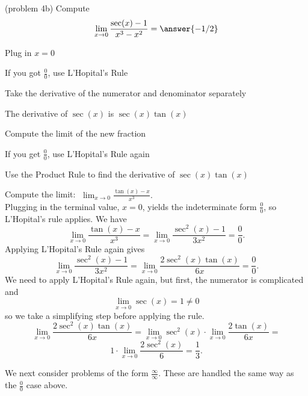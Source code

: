 \documentclass{ximera}
\begin{document}
\begin{problem}(problem 4b)
  Compute
  \[
  \lim_{x \to 0} \frac{\sec(x) - 1}{x^3 - x^2} = \answer{-1/2}
  \]
  
    \begin{hint}
      Plug in $x=0$
    \end{hint}
    \begin{hint}
      If you got $\frac00$, use L'Hopital's Rule
    \end{hint}
    \begin{hint}
      Take the derivative of the numerator and denominator separately
    \end{hint}
		\begin{hint}
		  The derivative of $\sec(x)$ is $\sec(x)\tan(x)$
	  \end{hint}
		\begin{hint}
      Compute the limit of the new fraction
    \end{hint}
		\begin{hint}
		 If you get $\frac00$, use L'Hopital's Rule again
    \end{hint}
		\begin{hint}
		  Use the Product Rule to find the derivative of $\sec(x)\tan(x)$
		\end{hint}
		
\end{problem}


\begin{example}[example 5]
Compute the limit:  $\displaystyle{\;\lim_{x \to 0} \frac{\tan(x)-x}{x^3}}.$\\
Plugging in the terminal value, $x=0$, yields 
the indeterminate form $\frac00$, so L'Hopital's rule applies.
We have 
\[\lim_{x \to 0} \frac{\tan(x)-x}{x^3} = \lim_{x \to 0} \frac{\sec^2(x)-1}{3x^2} = \frac{0}{0}.\]
Applying L'Hopital's Rule again gives
\[\lim_{x \to 0} \frac{\sec^2(x)-1}{3x^2} = \lim_{x \to 0} \frac{2\sec^2(x)\tan(x)}{6x} = \frac{0}{0}.\]	
We need to apply L'Hopital's Rule again, but first, the numerator is complicated and 								
\[\lim_{x \to 0} \sec(x) = 1 \neq 0\]
so we take a simplifying step before applying the rule.
\[\lim_{x \to 0} \frac{2\sec^2(x)\tan(x)}{6x} = 
\lim_{x \to 0} \sec^2(x) \cdot \lim_{x \to 0} \frac{2\tan(x)}{6x}=\]
 \[1\cdot \lim_{x \to 0} \frac{2\sec^2(x)}{6} =\frac{1}{3}.\]
\end{example}


We next consider problems of the form $\frac{\infty}{\infty}$.  These are handled the same way as the $\frac00$ case above.
\end{document}
